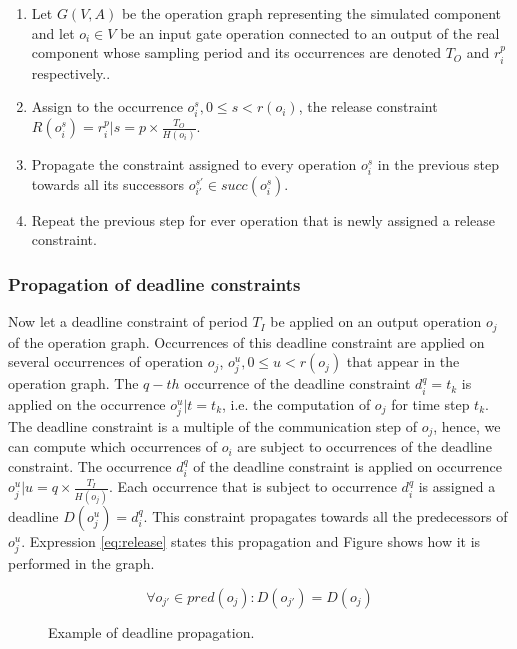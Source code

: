 \begin{enumerate}
\item Let $G(V,A)$ be the operation graph representing the simulated component and let $o_i \in  V$ be an input gate operation connected to an output of the real component whose sampling period and its occurrences are denoted $T_O$ and $r_i^p$ respectively..
\item Assign to the occurrence $o_i^s, 0 \leq s < r(o_i)$, the release constraint $R(o_i^s) = r_i^p | s = p \times \frac{T_O}{H(o_i)}$.
\item Propagate the constraint assigned to every operation $o_i^s$ in the previous step towards all its successors $o_{i'}^{s'} \in succ(o_i^s)$.
\item Repeat the previous step for ever operation that is newly assigned a release constraint.
\end{enumerate}

\subsubsection{Propagation of deadline constraints}

Now let a deadline constraint of period $T_I$ be applied on an output operation $o_j$ of the operation graph. Occurrences of this deadline constraint are applied on several occurrences of operation $o_j$, $o^u_j, 0 \leq u < r(o_j)$ that appear in the operation graph. The $q-th$ occurrence of the deadline constraint $d_i^q = t_k$ is applied on the occurrence $o^u_j | t = t_k$, i.e. the computation of ${o_j}$ for time step $t_k$. The deadline constraint is a multiple of the communication step of $o_j$, hence, we can compute which occurrences of $o_i$ are subject to occurrences of the deadline constraint. The occurrence $d_i^q$ of the deadline constraint is applied on occurrence $o^u_j | u = q \times \frac{T_I}{H(o_j)}$. Each occurrence that is subject to occurrence $d_i^q$ is assigned a deadline $D(o_j^u) = d_i^q$. This constraint propagates towards all the predecessors of $o_j^u$. Expression \ref{eq:release} states this propagation and Figure shows how it is performed in the graph.

\begin{equation}
\forall o_{j'} \in pred(o_j): D(o_{j'}) = D(o_j)
\label{eq:release}
\end{equation}

\begin{figure}[phbt]
\centering

\caption{Example of deadline propagation.}
\label{fig:dpropagation}
\end{figure}

